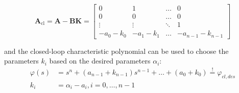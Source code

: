     {\footnotesize
        \noindent\begin{equation*}
            \mathbf{A}_{\mathrm{cl}}=\mathbf{A-BK}=\begin{bmatrix}
                0        & 1        & \ldots & 0                \\
                0        & 0        & \ldots & 0                \\
                \vdots   & \vdots   & \ddots & 1                \\
                -a_0-k_0 & -a_1-k_1 & \ldots & -a_{n-1}-k_{n-1}
            \end{bmatrix}
        \end{equation*}
    }

and the closed-loop characteristic polynomial can be used to choose the parameters $k_i$ based on the desired parameters $\alpha_i$:
\noindent\begin{align*}
    \varphi(s) & =s^n+(a_{n-1}+k_{n-1})s^{n-1}+\ldots+(a_0+k_0) \overset{!}{=} \varphi_{cl,des} \\
    k_i        & =\alpha_i-a_i,i=0,\ldots,n-1
\end{align*}

